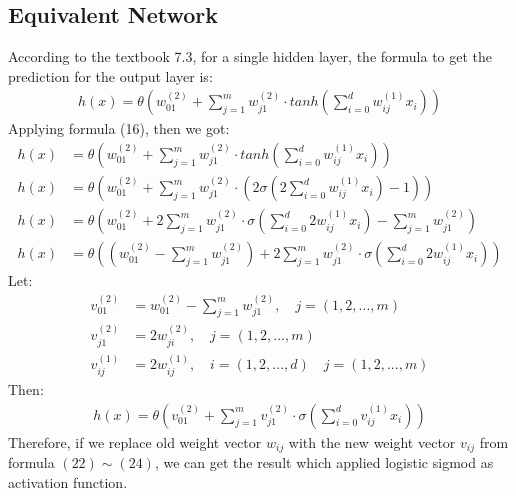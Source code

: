\documentclass{article}
\begin{document}
\subsection{Equivalent Network}
	According to the textbook 7.3, for a single hidden layer, the formula to get the prediction for the output layer is:
	\begin{align}
	h(x) = \theta\left(w_{01}^{(2)}+\sum_{j=1}^{m}w_{j1}^{(2)}\cdot tanh(\sum_{i=0}^{d}w_{ij}^{(1)}x_{i})\right)
	\end{align}
	Applying formula (16), then we got:
	\begin{align}
		h(x) &= \theta\left(w_{01}^{(2)}+\sum_{j=1}^{m}w_{j1}^{(2)}\cdot tanh(\sum_{i=0}^{d}w_{ij}^{(1)}x_{i})\right)\\
		h(x) &= \theta\left(w_{01}^{(2)}+\sum_{j=1}^{m}w_{j1}^{(2)}\cdot \left(2\sigma(2\sum_{i=0}^{d}w_{ij}^{(1)}x_{i})-1\right)\right)\\
		h(x) &= \theta\left(w_{01}^{(2)}+2\sum_{j=1}^{m}w_{j1}^{(2)}\cdot \sigma(\sum_{i=0}^{d}2w_{ij}^{(1)}x_{i})-\sum_{j=1}^{m}w_{j1}^{(2)}\right)\\
		h(x) &= \theta\left(\left(w_{01}^{(2)}-\sum_{j=1}^{m}w_{j1}^{(2)}\right)+2\sum_{j=1}^{m}w_{j1}^{(2)}\cdot \sigma(\sum_{i=0}^{d}2w_{ij}^{(1)}x_{i})\right)
	\end{align}
	Let:
	\begin{align}
	v_{01}^{(2)} &= w_{01}^{(2)}-\sum_{j=1}^{m}w_{j1}^{(2)}, \quad j =(1,2,...,m)\\
	v_{j1}^{(2)} &= 2w_{ji}^{(2)},\quad j=(1,2,...,m)\\
	v_{ij}^{(1)} &= 2w_{ij}^{(1)},\quad i=(1,2,...,d) \quad j =(1,2,...,m)
	\end{align}
	Then:
	\begin{align}
		h(x) = \theta\left(v_{01}^{(2)} +\sum_{j=1}^{m}v_{j1}^{(2)}\cdot \sigma(\sum_{i=0}^{d}v_{ij}^{(1)}x_{i})\right)
	\end{align}
	Therefore, if we replace old weight vector $w_{ij}$ with the new weight vector $v_{ij}$ from formula $(22) \sim (24)$, we can get the result which applied logistic sigmod as activation function. 
	
\end{document}
